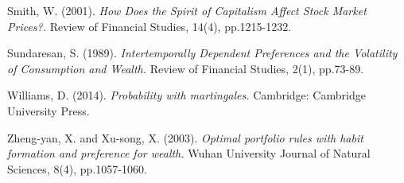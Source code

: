 \documentclass[a4paper]{article}
\theoremstyle{definition}
\numberwithin{equation}{section}
\begin{document}
\begin{thebibliography}{9}
 Smith, W. (2001). \textit{How Does the Spirit of Capitalism Affect Stock Market Prices?.} Review of Financial Studies, 14(4), pp.1215-1232.

 Sundaresan, S. (1989). \textit{Intertemporally Dependent Preferences and the Volatility of Consumption and Wealth.} Review of Financial Studies, 2(1), pp.73-89.

 Williams, D. (2014). \textit{Probability with martingales.} Cambridge: Cambridge University Press.

 Zheng-yan, X. and Xu-song, X. (2003). \emph{Optimal portfolio rules with habit formation and preference for wealth.} Wuhan University Journal of Natural Sciences, 8(4), pp.1057-1060.

\end{thebibliography}
\end{document}
